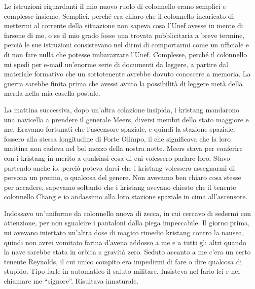 Le istruzioni riguardanti il mio nuovo ruolo di colonnello erano
semplici e complesse insieme. Semplici, perché era chiaro che il
colonnello incaricato di mettermi al corrente della situazione non
sapeva cosa l'Unef avesse in mente di farsene di me, o se il mio grado
fosse una trovata pubblicitaria a breve termine, perciò le sue
istruzioni consistevano nel dirmi di comportarmi come un ufficiale e di
non fare nulla che potesse imbarazzare l'Unef. Complesse, perché il
colonnello mi spedì per e-mail un'enorme serie di documenti da leggere,
a partire dal materiale formativo che un sottotenente avrebbe dovuto
conoscere a memoria. La guerra sarebbe finita prima che avessi avuto la
possibilità di leggere metà della merda nella mia casella postale.

La mattina successiva, dopo un'altra colazione insipida, i kristang
mandarono una navicella a prendere il generale Meers, diversi membri
dello stato maggiore e me. Eravamo fortunati che l'ascensore spaziale, e
quindi la stazione spaziale, fossero alla stessa longitudine di Forte
Olimpo, il che significava che la loro mattina non cadeva nel bel mezzo
della nostra notte. Meers stava per conferire con i kristang in merito a
qualsiasi cosa di cui volessero parlare loro. Stavo partendo anche io,
perciò poteva darsi che i kristang volessero assegnarmi di persona un
premio, o qualcosa del genere. Non avevamo ben chiaro cosa stesse per
accadere, sapevamo soltanto che i kristang avevano chiesto che il
tenente colonnello Chang e io andassimo alla loro stazione spaziale in
cima all'ascensore.

Indossavo un'uniforme da colonnello nuova di zecca, in cui cercavo di
sedermi con attenzione, per non sgualcire i pantaloni dalla piega
impeccabile. Il giorno prima, mi avevano iniettato un'altra dose di
magico rimedio kristang contro la nausea, quindi non avrei vomitato
farina d'avena addosso a me e a tutti gli altri quando la nave sarebbe
stata in orbita a gravità zero. Seduto accanto a me c'era un certo
tenente Reynolds, il cui unico compito era impedirmi di fare o dire
qualcosa di stupido. Tipo farle in automatico il saluto militare.
Insisteva nel farlo lei e nel chiamare me ``signore''. Risultava
innaturale.

